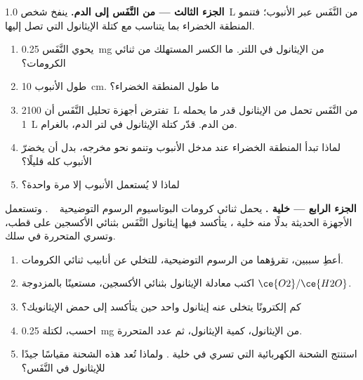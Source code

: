 \begin{problem}
\medskip
\noindent\textbf{الجزء الثالث --- من النَّفَس إلى الدم.}
ينفخ شخص \qty{1.0}{L} من النَّفَس عبر الأنبوب؛ فتنمو المنطقة الخضراء
بما يتناسب مع كتلة الإيثانول التي تصل إليها.
\begin{enumerate}[resume]
  \item يحوي النَّفَس \qty{0.25}{mg} من الإيثانول في اللتر. ما
        الكسر المستهلك من ثنائي الكرومات؟
  \item طول الأنبوب \qty{10}{cm}. ما طول المنطقة الخضراء؟
  \item تفترض أجهزة تحليل النَّفَس أن \qty{2100}{L} من النَّفَس تحمل
        من الإيثانول قدر ما يحمله \qty{1}{L} من الدم. قدّر كتلة الإيثانول
        في لتر الدم، بالغرام.
  \item لماذا تبدأ المنطقة الخضراء عند مدخل الأنبوب وتنمو
        نحو مخرجه، بدل أن يخضرّ الأنبوب كله
        قليلًا؟
  \item لماذا لا يُستعمل الأنبوب إلا مرة واحدة؟
\end{enumerate}

\medskip
\noindent\textbf{الجزء الرابع --- خلية .}
يحمل ثنائي كرومات البوتاسيوم الرسوم التوضيحية
\,\,\,\,\,.
وتستعمل الأجهزة الحديثة بدلًا منه خلية ، يتأكسد فيها إيثانول
النَّفَس بثنائي الأكسجين على قطب، وتسري 
المتحررة في سلك.
\begin{enumerate}[resume]
  \item أعطِ سببين، تقرؤهما من الرسوم التوضيحية، للتخلي عن أنابيب
        ثنائي الكرومات.
  \item اكتب معادلة  الإيثانول بثنائي الأكسجين،
        مستعينًا بالمزدوجة $\ce{O2}/\ce{H2O}$.
  \item كم إلكترونًا يتخلى عنه  إيثانول واحد حين
        يتأكسد إلى حمض الإيثانويك؟
  \item احسب، لكتلة \qty{0.25}{mg} من الإيثانول، كمية الإيثانول،
        ثم عدد  المتحررة.
  \item استنتج الشحنة الكهربائية التي تسري في خلية .
        ولماذا تُعد هذه الشحنة مقياسًا جيدًا للإيثانول في النَّفَس؟
\end{enumerate}
\end{problem}
